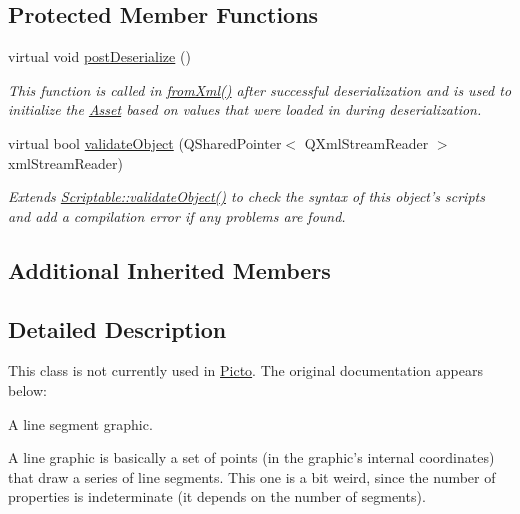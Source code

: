 \subsection*{Protected Member Functions}
\begin{DoxyCompactItemize}
\item 
virtual void \hyperlink{class_picto_1_1_line_graphic_ae17b91123b57bec526e5172d739bc18e}{post\-Deserialize} ()
\begin{DoxyCompactList}\small\item\em This function is called in \hyperlink{class_picto_1_1_asset_a8bed4da09ecb1c07ce0dab313a9aba67}{from\-Xml()} after successful deserialization and is used to initialize the \hyperlink{class_picto_1_1_asset}{Asset} based on values that were loaded in during deserialization. \end{DoxyCompactList}\item 
\hypertarget{class_picto_1_1_line_graphic_a5cad9a7211dbd29c5c38c01bec88ec48}{virtual bool \hyperlink{class_picto_1_1_line_graphic_a5cad9a7211dbd29c5c38c01bec88ec48}{validate\-Object} (Q\-Shared\-Pointer$<$ Q\-Xml\-Stream\-Reader $>$ xml\-Stream\-Reader)}\label{class_picto_1_1_line_graphic_a5cad9a7211dbd29c5c38c01bec88ec48}

\begin{DoxyCompactList}\small\item\em Extends \hyperlink{class_picto_1_1_scriptable_ab6e2944c43a3b5d418bf7b251594386d}{Scriptable\-::validate\-Object()} to check the syntax of this object's scripts and add a compilation error if any problems are found. \end{DoxyCompactList}\end{DoxyCompactItemize}
\subsection*{Additional Inherited Members}


\subsection{Detailed Description}
This class is not currently used in \hyperlink{namespace_picto}{Picto}. The original documentation appears below\-: 

A line segment graphic.

A line graphic is basically a set of points (in the graphic's internal coordinates) that draw a series of line segments. This one is a bit weird, since the number of properties is indeterminate (it depends on the number of segments).


